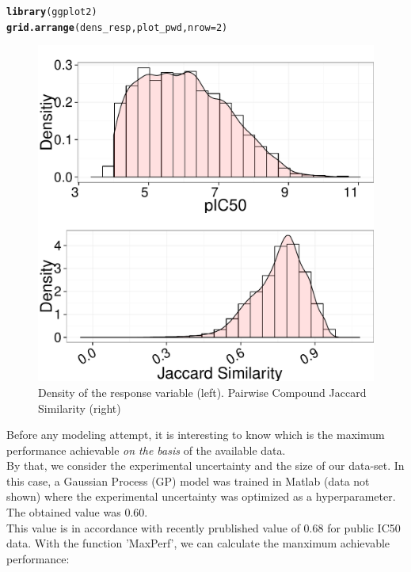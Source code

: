 \documentclass[twoside,a4wide,12pt]{article}\usepackage[]{graphicx}\usepackage[]{color}
\makeatletter
\def\maxwidth{ %
  \ifdim\Gin@nat@width>\linewidth
    \linewidth
  \else
    \Gin@nat@width
  \fi
}
\newcommand{\hlnum}[1]{\textcolor[rgb]{0.686,0.059,0.569}{#1}}%
\newcommand{\hlstd}[1]{\textcolor[rgb]{0.345,0.345,0.345}{#1}}%
\newcommand{\hlkwc}[1]{\textcolor[rgb]{0.333,0.667,0.333}{#1}}%
\newcommand{\hlkwd}[1]{\textcolor[rgb]{0.737,0.353,0.396}{\textbf{#1}}}%
\newenvironment{kframe}{%
 \def\at@end@of@kframe{}%
 \ifinner\ifhmode%
  \def\at@end@of@kframe{\end{minipage}}%
  \begin{minipage}{\columnwidth}%
 \fi\fi%
 \def\FrameCommand##1{\hskip\@totalleftmargin \hskip-\fboxsep
 \colorbox{shadecolor}{##1}\hskip-\fboxsep
     \hskip-\linewidth \hskip-\@totalleftmargin \hskip\columnwidth}%
 \MakeFramed {\advance\hsize-\width
   \@totalleftmargin\z@ \linewidth\hsize
   \@setminipage}}%
 {\par\unskip\endMakeFramed%
 \at@end@of@kframe}
\newenvironment{knitrout}{}{} %
\makeatother
\begin{document}
\begin{knitrout}
\color{fgcolor}\begin{kframe}
\begin{alltt}
\hlkwd{library}\hlstd{(ggplot2)}
\hlkwd{grid.arrange}\hlstd{(dens_resp, plot_pwd,} \hlkwc{nrow} \hlstd{=} \hlnum{2}\hlstd{)}
\end{alltt}
\end{kframe}\begin{figure}[]


{\centering \includegraphics[width=\maxwidth]{figure/unnamed-chunk-23} 

}

\caption[Density of the response variable (left)]{Density of the response variable (left). Pairwise Compound Jaccard Similarity (right)\label{fig:unnamed-chunk-23}}
\end{figure}


\end{knitrout}


Before any modeling attempt, it is interesting to know which is the maximum performance achievable {\it on the basis} of the available data.\\ 
By that, we consider the experimental uncertainty and the size of our data-set. 
In this case, a Gaussian Process (GP) model was trained in Matlab (data not shown) where the experimental uncertainty was optimized as a hyperparameter. The obtained value was 0.60.\\
This value is in accordance with recently prublished value of 0.68 for public IC50 data.
With the function 'MaxPerf', we can calculate the manximum achievable performance:
\end{document}
